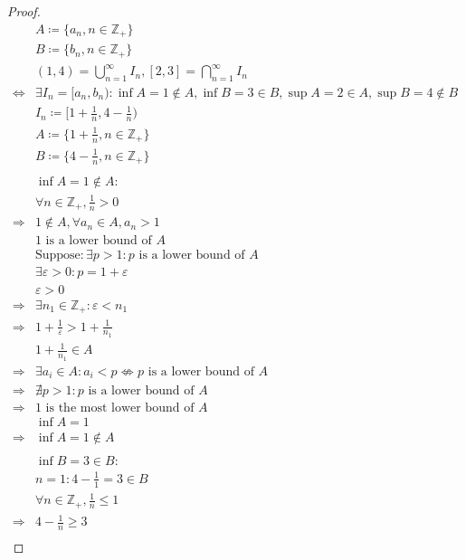 \documentclass{article}
\begin{document}
\begin{proof}
    \begin{align*}
        &A\coloneqq\{a_n,n\in\mathbb{Z} _+\}\\
        &B\coloneqq\{b_n,n\in\mathbb{Z} _+\}\\
        &(1,4)=\bigcup_{n=1}^{\infty}I_n,[2,3]=\bigcap_{n=1}^{\infty}I_n\\
        \Leftrightarrow&\exists I_n=[a_n,b_n):\inf A=1\notin A,\inf B=3\in B, \sup A=2\in A,\sup B=4\notin B\\
        &I_n\coloneqq[1+\frac{1}{n},4-\frac{1}{n})\\
        &A\coloneqq\{1+\frac{1}{n},n\in\mathbb{Z} _+\}\\
        &B\coloneqq\{4-\frac{1}{n},n\in\mathbb{Z} _+\}\\
        &\\
        &\inf A=1\notin A:\\
        &\forall n\in\mathbb{Z} _+,\frac{1}{n}>0\\
        \Rightarrow&1\notin A, \forall a_n\in A,a_n>1\\
        &1\text{ is a lower bound of }A\\
        &\text{Suppose}: \exists p>1: p\text{ is a lower bound of }A\\
        &\exists \varepsilon>0:p=1+\varepsilon\\
        &\varepsilon>0\\
        \Rightarrow&\exists n_1\in\mathbb{Z} _+:\varepsilon<n_1\\
        \Rightarrow&1+\frac{1}{\varepsilon}>1+\frac{1}{n_1}\\
        &1+\frac{1}{n_1}\in A\\
        \Rightarrow&\exists a_i\in A:a_i<p\nLeftrightarrow p\text{ is a lower bound of }A\\
        \Rightarrow&\nexists p>1:p\text{ is a lower bound of }A\\
        \Rightarrow&1\text{ is the most lower bound of }A\\
        &\inf A=1\\
        \Rightarrow&\inf A=1\notin A\\
        &\\
        &\inf B=3\in B:\\
        &n=1:4-\frac{1}{1}=3\in B\\
        &\forall n\in\mathbb{Z} _+,\frac{1}{n}\leqslant 1\\
        \Rightarrow&4-\frac{1}{n}\geqslant 3\\

\end{align*}
\end{proof}
\end{document}
